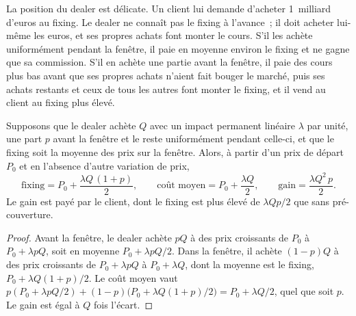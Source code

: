 La position du dealer est délicate. Un client lui demande d'acheter 1~milliard d'euros au
fixing. Le dealer ne connaît pas le fixing à l'avance~; il doit acheter lui-même les euros,
et ses propres achats font monter le cours. S'il les achète uniformément pendant la
fenêtre, il paie en moyenne environ le fixing et ne gagne que sa commission. S'il
en achète une partie avant la fenêtre, il paie des cours plus bas avant que ses propres
achats n'aient fait bouger le marché, puis ses achats restants et ceux de tous les autres
font monter le fixing, et il vend au client au fixing plus élevé.

\begin{proposition}\label{prop:m2:fixings-and-flows:prehedge}
Supposons que le dealer achète $Q$ avec un impact permanent linéaire $\lambda$ par unité, une part
$p$ avant la fenêtre et le reste uniformément pendant celle-ci, et que le fixing soit la
moyenne des prix sur la fenêtre. Alors, à partir d'un prix de départ $P_0$ et en l'absence d'autre
variation de prix,
\[
\text{fixing} = P_0 + \frac{\lambda Q\,(1+p)}{2}, \qquad
\text{coût moyen} = P_0 + \frac{\lambda Q}{2}, \qquad
\text{gain} = \frac{\lambda Q^2\,p}{2}.
\]
Le gain est payé par le client, dont le fixing est plus élevé de $\lambda Q p/2$ que
sans pré-couverture.
\end{proposition}

\begin{proof}
Avant la fenêtre, le dealer achète $pQ$ à des prix croissants de $P_0$ à
$P_0 + \lambda pQ$, soit en moyenne $P_0 + \lambda pQ/2$. Dans la fenêtre, il achète $(1-p)Q$
à des prix croissants de $P_0 + \lambda pQ$ à $P_0 + \lambda Q$, dont la moyenne est le
fixing, $P_0 + \lambda Q(1+p)/2$. Le coût moyen vaut $p(P_0 + \lambda pQ/2) +
(1-p)\bigl(P_0 + \lambda Q(1+p)/2\bigr) = P_0 + \lambda Q/2$, quel que soit $p$. Le
gain est égal à $Q$ fois l'écart.
\end{proof}

